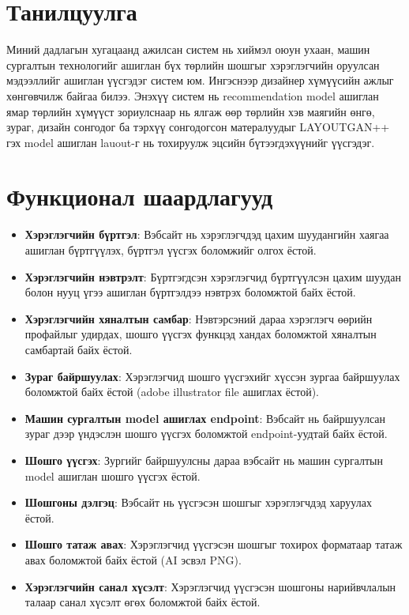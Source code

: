 \section{Танилцуулга}
Миний дадлагын хугацаанд ажилсан систем нь хиймэл оюун ухаан, машин сургалтын технологийг ашиглан бүх төрлийн шошгыг хэрэглэгчийн оруулсан мэдээллийг ашиглан үүсгэдэг систем юм. Ингэснээр дизайнер хүмүүсийн ажлыг хөнгөвчилж байгаа билээ. Энэхүү систем нь recommendation model ашиглан ямар төрлийн хүмүүст зориулснаар нь ялгаж өөр төрлийн хэв маягийн өнгө, зураг, дизайн сонгодог ба тэрхүү сонгодогсон матералуудыг LAYOUTGAN++ гэх model ашиглан lauout-г нь тохируулж эцсийн бүтээгдэхүүнийг үүсгэдэг.
\section{Функционал шаардлагууд}
\begin{itemize}
	\item \textbf{Хэрэглэгчийн бүртгэл}: Вэбсайт нь хэрэглэгчдэд цахим шуудангийн хаягаа ашиглан бүртгүүлэх, бүртгэл үүсгэх боломжийг олгох ёстой.

	\item \textbf{Хэрэглэгчийн нэвтрэлт}: Бүртгэгдсэн хэрэглэгчид бүртгүүлсэн цахим шуудан болон нууц үгээ ашиглан бүртгэлдээ нэвтрэх боломжтой байх ёстой.

	\item \textbf{Хэрэглэгчийн хяналтын самбар}: Нэвтэрсэний дараа хэрэглэгч өөрийн профайлыг удирдах, шошго үүсгэх функцэд хандах боломжтой хяналтын самбартай байх ёстой.

	\item \textbf{Зураг байршуулах}: Хэрэглэгчид шошго үүсгэхийг хүссэн зургаа байршуулах боломжтой байх ёстой (adobe illustrator file ашиглах ёстой).

	\item \textbf{Машин сургалтын model ашиглах endpoint}: Вэбсайт нь байршуулсан зураг дээр үндэслэн шошго үүсгэх боломжтой endpoint-уудтай байх ёстой.

	\item \textbf{Шошго үүсгэх}: Зургийг байршуулсны дараа вэбсайт нь машин сургалтын model ашиглан шошго үүсгэх ёстой.

	\item \textbf{Шошгоны дэлгэц}: Вэбсайт нь үүсгэсэн шошгыг хэрэглэгчдэд харуулах ёстой.

	\item \textbf{Шошго татаж авах}: Хэрэглэгчид үүсгэсэн шошгыг тохирох форматаар татаж авах боломжтой байх ёстой (AI эсвэл PNG).

	\item \textbf{Хэрэглэгчийн санал хүсэлт}: Хэрэглэгчид үүсгэсэн шошгоны нарийвчлалын талаар санал хүсэлт өгөх боломжтой байх ёстой.
\end{itemize}
